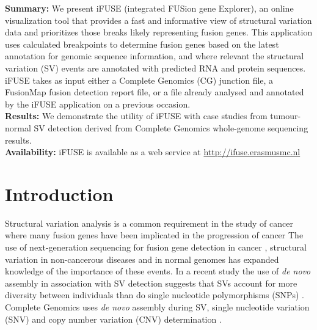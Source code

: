\textbf{Summary:} We present iFUSE (integrated FUSion gene Explorer), an online visualization tool that provides a fast and informative view of structural variation data and prioritizes those breaks likely representing fusion genes. \color{black} This application uses calculated breakpoints to determine fusion genes based on the latest annotation for genomic sequence information, and where relevant the structural variation (SV) events are annotated with predicted RNA and protein sequences. iFUSE takes as input either a Complete Genomics (CG) junction file, a FusionMap \cite{ge2011fusionmap} fusion detection report file, or a file already analysed and annotated by the iFUSE application on a previous occasion. \\
\textbf{Results:} We demonstrate the utility of iFUSE with case studies from tumour-normal SV detection derived from Complete Genomics whole-genome sequencing results. \\
\textbf{Availability:} iFUSE is available as a web service at \url{http://ifuse.erasmusmc.nl}


\section*{Introduction}

Structural variation analysis is a common requirement in the study of cancer where many fusion genes have been implicated in the progression of cancer \cite{mitelman2007impact, kumar2008recurrent}
The use of next-generation sequencing for fusion gene detection in cancer \cite{edgren2011identification, ge2011fusionmap, mcpherson2011defuse}, structural variation in non-cancerous diseases \cite{sanders2011multiple, levy2011rare} and in normal genomes \cite{10002010map} has expanded knowledge of the importance of these events.
In a recent study the use of \textit{de novo} assembly in association with SV detection suggests that SVs account for more diversity between individuals than do single nucleotide polymorphisms (SNPs) \cite{li2011structural}. Complete Genomics uses \textit{de novo} assembly during SV, single nucleotide variation (SNV) and copy number variation (CNV) determination \cite{carnevali2012computational}.

